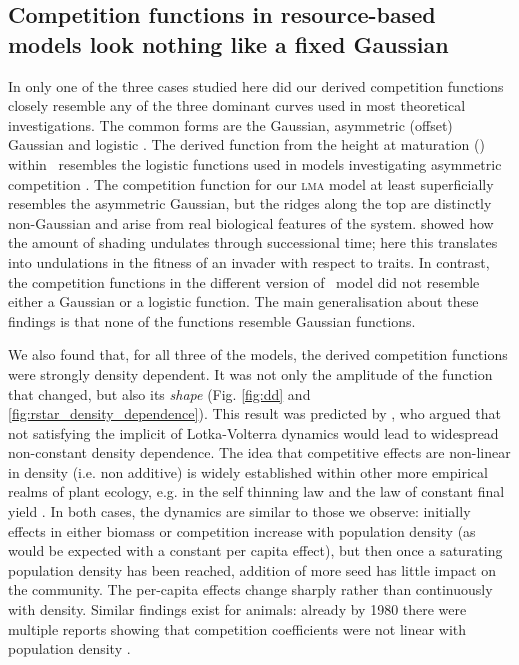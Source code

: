 \documentclass[a4paper,11pt]{article}
\begin{document}
\subsection{Competition functions in resource-based models look nothing like a
fixed Gaussian}

In only one of the three cases studied here did our derived
competition functions closely resemble any of the three dominant
curves used in most theoretical investigations. The common forms are
the Gaussian, asymmetric (offset) Gaussian \citep{Roughgarden-1979}
and logistic \citep[e.g.][]{Kisdi-1999, Law-1997}.  The derived
function from the height at maturation (\hmat) within \plant\
resembles the logistic functions used in models investigating
asymmetric competition \citep{Law-1997, Geritz-1999, Kisdi-1999,
  Calcagno-2006}.
%
The competition function for our \textsc{lma} model
at least superficially resembles the asymmetric Gaussian, but the
ridges along the top are distinctly non-Gaussian and arise from real
biological features of the system.
%
\citet{Falster-2011} showed how the amount of shading undulates
through successional time; here this translates into undulations in
the fitness of an invader with respect to traits.
%
In contrast, the competition functions in the different version of \Rstar\ model did not resemble either a Gaussian or a logistic function.
%
The main generalisation about these findings is that
none of the functions resemble Gaussian functions.

We also found that, for all three of the models, the derived
competition functions were strongly density dependent. It was not only
the amplitude of the function that changed, but also its \emph{shape}
(Fig. \ref{fig:dd} and \ref{fig:rstar_density_dependence}).
%
This result was predicted by \citet{Abrams-1980}, who argued that not
satisfying the implicit of Lotka-Volterra dynamics would lead to
widespread non-constant density dependence. The idea that competitive
effects are non-linear in density (i.e. non additive) is widely
established within other more empirical realms of plant ecology, e.g.
in the self thinning law and the law of constant
final yield \citep{Harper-1977}.
In both cases, the dynamics are similar to those we observe: initially
effects in either biomass or competition increase with population
density (as would be expected with a constant per capita effect), but
then once a saturating population density has been reached, addition
of more seed has little impact on the community. The
per-capita effects change sharply rather than continuously with density. Similar findings exist
for animals: already by 1980 there were multiple reports showing that
competition coefficients were not linear with population density
\citep{Abrams-1980}.
\end{document}
